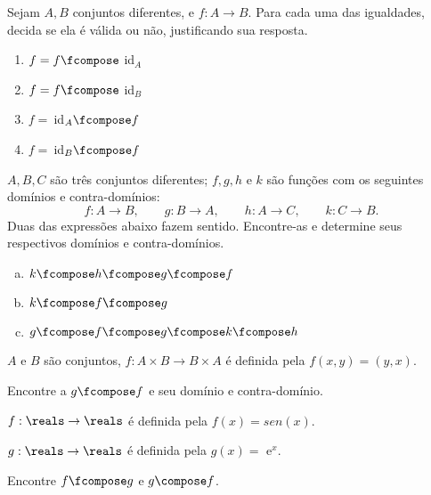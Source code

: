 \begin{exercise}
    Sejam $A,B$ conjuntos diferentes, e $f : A \to B$. Para cada uma das igualdades, decida se ela é válida ou não, justificando sua resposta.
    \begin{enumerate}[(1)]
        \item $f = f \fcompose$ id$_A$
        \item $f = f \fcompose$ id$_B$
        \item $f =\ $id$_A \fcompose f$
        \item $f =\ $id$_B \fcompose f$
    \end{enumerate}
\end{exercise}

\begin{exercise}
    $A,B,C$ são três conjuntos diferentes; $f,g,h$ e $k$ são funções com os seguintes domínios e contra-domínios:
    $$
    \left.
        f : A \to B,
    \right.
    \qquad
    \left.
        g : B \to A,
    \right.
    \qquad
    \left.
        h : A \to C,
    \right.
    \qquad
    \left.
        k : C \to B.
    \right.
    $$
    Duas das expressões abaixo fazem sentido. Encontre-as e determine seus respectivos domínios e contra-domínios.
    \begin{enumerate}[(a)]
        \item $k \fcompose h \fcompose g \fcompose f$
        \item $k \fcompose f \fcompose g$
        \item $g \fcompose f \fcompose g \fcompose k \fcompose h$
    \end{enumerate}
\end{exercise}

\begin{exercise}
    $A$ e $B$ são conjuntos, $f : A \times B \to B \times A$ é definida pela $f(x,y) = (y,x)$.

    Encontre a $g \fcompose f$ e seu domínio e contra-domínio.
\end{exercise}

\begin{exercise}
\hfill

$ f : \reals \to \reals$ é definida pela $f(x) = sen(x)$.

$ g : \reals \to \reals$ é definida pela $g(x) =$ e$^x$.

\hfill

Encontre $f \fcompose g$ e $g \compose f$.
\end{exercise}


